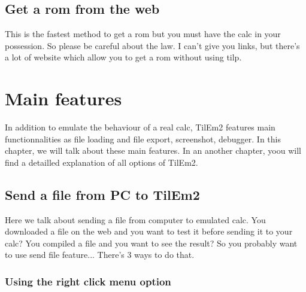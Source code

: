 \documentclass[10pt]{report}
\begin{document}
\section{Get a rom from the web}

This is the fastest method to get a rom but you must have the calc in your possession.\newline
So please be careful about the law.\newline
I can't give you links, but there's a lot of website which allow you to get a rom without using tilp.\newline

\chapter{Main features}

In addition to emulate the behaviour of a real calc, TilEm2 features main functionnalities as file loading and file export, screenshot, debugger.\newline
In this chapter, we will talk about these main features.\newline
In an another chapter, yoou will find a detailled explanation of all options of TilEm2.\newline

\section{Send a file from PC to TilEm2}

Here we talk about sending a file from computer to emulated calc.\newline
You downloaded a file on the web and you want to test it before sending it to your calc?\newline
You compiled a file and you want to see the result?\newline
So you probably want to use send file feature...\newline\newline
There's 3 ways to do that.\newline

\subsection{Using the right click menu option}
\end{document}
